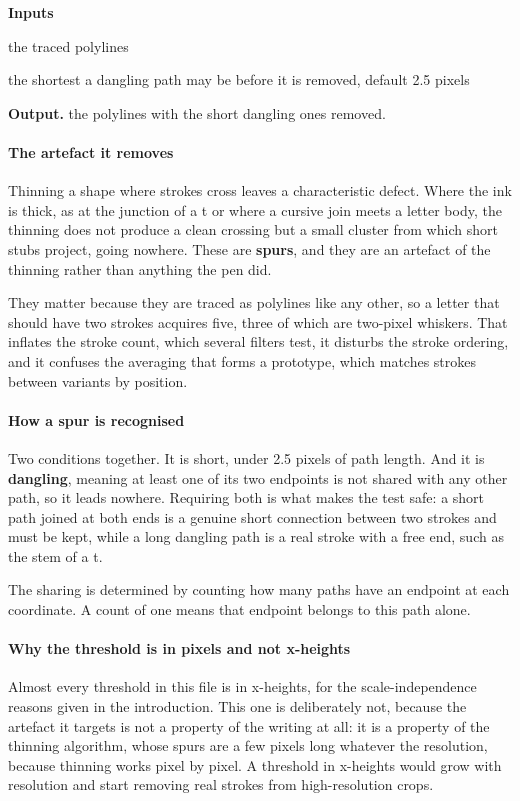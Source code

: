 \noindent\textbf{Inputs}
\begin{description}[leftmargin=2.2em,style=nextline,font=\normalfont\ttfamily]\setlength\itemsep{1pt}
  \item[{chains}] \normalfont the traced polylines
  \item[{minLen}] \normalfont the shortest a dangling path may be before it is removed, default 2.5 pixels
\end{description}

\noindent\textbf{Output.} the polylines with the short dangling ones removed.


\paragraph{The artefact it removes}
Thinning a shape where strokes cross leaves a characteristic defect. Where the ink is thick, as at the junction of a t or where a cursive join meets a letter body, the thinning does not produce a clean crossing but a small cluster from which short stubs project, going nowhere. These are \textbf{spurs}, and they are an artefact of the thinning rather than anything the pen did.

They matter because they are traced as polylines like any other, so a letter that should have two strokes acquires five, three of which are two-pixel whiskers. That inflates the stroke count, which several filters test, it disturbs the stroke ordering, and it confuses the averaging that forms a prototype, which matches strokes between variants by position.


\paragraph{How a spur is recognised}
Two conditions together. It is short, under 2.5 pixels of path length. And it is \textbf{dangling}, meaning at least one of its two endpoints is not shared with any other path, so it leads nowhere. Requiring both is what makes the test safe: a short path joined at both ends is a genuine short connection between two strokes and must be kept, while a long dangling path is a real stroke with a free end, such as the stem of a t.

The sharing is determined by counting how many paths have an endpoint at each coordinate. A count of one means that endpoint belongs to this path alone.


\paragraph{Why the threshold is in pixels and not x-heights}
Almost every threshold in this file is in x-heights, for the scale-independence reasons given in the introduction. This one is deliberately not, because the artefact it targets is not a property of the writing at all: it is a property of the thinning algorithm, whose spurs are a few pixels long whatever the resolution, because thinning works pixel by pixel. A threshold in x-heights would grow with resolution and start removing real strokes from high-resolution crops.


